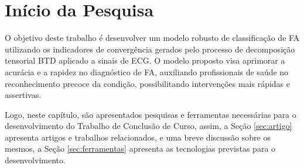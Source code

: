 \chapter{Início da Pesquisa}

O objetivo deste trabalho é desenvolver um modelo robusto de classificação de \gls{FA} utilizando os indicadores de convergência gerados pelo processo de decomposição tensorial \gls{BTD} aplicado a sinais de \gls{ECG}. O modelo proposto visa aprimorar a acurácia e a rapidez no diagnóstico de \gls{FA}, auxiliando profissionais de saúde no reconhecimento precoce da condição, possibilitando intervenções mais rápidas e assertivas.

Logo, neste capítulo, são apresentados pesquisas e ferramentas necessárias para o desenvolvimento do Trabalho de Conclusão de Curso, assim, a Seção \ref{sec:artigo} apresenta artigos e trabalhos relacionados, e uma breve discussão sobre os mesmos, a Seção \ref{sec:ferramentas} apresenta as tecnologias previstas para o desenvolvimento.





